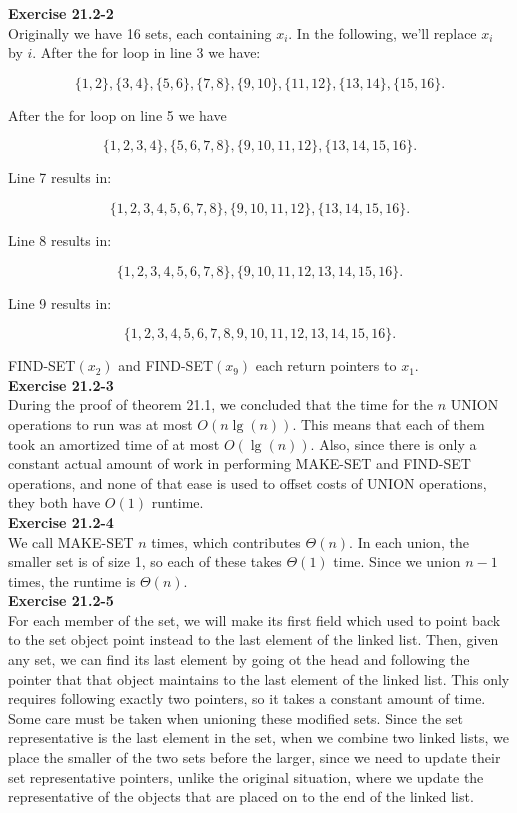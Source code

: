\documentclass{article}
\begin{document}
\noindent\textbf{Exercise 21.2-2}\\

Originally we have 16 sets, each containing $x_i$.  In the following, we'll replace $x_i$ by $i$.  After the for loop in line 3 we have:

\[ \{1,2\}, \{3,4\}, \{5,6\}, \{7,8\}, \{9,10\}, \{11,12\}, \{13,14\}, \{15,16\}.\]

After the for loop on line 5 we have

\[ \{1,2,3,4\}, \{5,6,7,8\}, \{9,10,11,12\}, \{13,14,15,16\}.\]

Line 7 results in:

\[ \{1,2,3,4,5,6,7,8\}, \{9,10,11,12\}, \{13,14,15,16\}.\]

Line 8 results in:

\[ \{1,2,3,4,5,6,7,8\}, \{9,10,11,12,13,14,15,16\}.\]

Line 9 results in:

\[ \{1,2,3,4,5,6,7,8,9,10,11,12,13,14,15,16\}.\]

FIND-SET$(x_2)$ and FIND-SET$(x_9)$ each return pointers to $x_1$. \\

\noindent\textbf{Exercise 21.2-3}\\

During the proof of theorem 21.1, we concluded that the time for the $n$ UNION operations to run was at most $O(n\lg(n))$. This means that each of them took an amortized time of at most $O(\lg(n))$. Also, since there is only a constant actual amount of work in performing MAKE-SET and FIND-SET operations, and none of that ease is used to offset costs of UNION operations, they both have $O(1)$ runtime.\\

\noindent\textbf{Exercise 21.2-4}\\

We call MAKE-SET $n$ times, which contributes $\Theta(n)$.  In each union, the smaller set is of size 1, so each of these takes $\Theta(1)$ time.  Since we union $n-1$ times, the runtime is $\Theta(n)$. \\

\noindent\textbf{Exercise 21.2-5}\\

For each member of the set, we will make its first field which used to point back to the set object point instead to the last element of the linked list. Then, given any set, we can find its last element by going ot the head and following the pointer that that object maintains to the last element of the linked list. This only requires following exactly two pointers, so it takes a constant amount of time. Some care must be taken when unioning these modified sets. Since the set representative is the last element in the set, when we combine two linked lists, we place the smaller of the two sets before the larger, since we need to update their set representative pointers, unlike the original situation, where we update the representative of the objects that are placed on to the end of the linked list.\\
\end{document}
